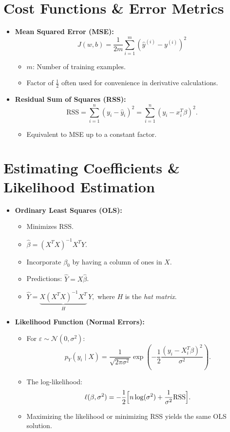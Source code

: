 \documentclass[10pt]{article}
\begin{document}
\section{Cost Functions \& Error Metrics}
\begin{itemize}
    \item \textbf{Mean Squared Error (MSE):}
    \[
    J(w,b)=\frac{1}{2m} \sum_{i=1}^{m}\left(\hat{y}^{(i)}-y^{(i)}\right)^{2}
    \]
    \begin{itemize}
        \item \(m\): Number of training examples.
        \item Factor of \(\tfrac{1}{2}\) often used for convenience in derivative calculations.
    \end{itemize}
    \item \textbf{Residual Sum of Squares (RSS):}
    \[
    \mathrm{RSS}=\sum_{i=1}^{n}\left(y_{i}-\hat{y}_{i}\right)^{2}=\sum_{i=1}^{n}\left(y_{i}-x_{i}^{T}\beta\right)^{2}.
    \]
    \begin{itemize}
        \item Equivalent to MSE up to a constant factor.
    \end{itemize}
\end{itemize}

\section{Estimating Coefficients \& Likelihood Estimation}
\begin{itemize}
    \item \textbf{Ordinary Least Squares (OLS):}
    \begin{itemize}
        \item Minimizes RSS.
        \item \(\displaystyle \hat{\beta}=(X^{T}X)^{-1}X^{T}Y\).
        \item Incorporate \(\beta_0\) by having a column of ones in \(X\).
        \item Predictions: \(\hat{Y} = X\hat{\beta}\).
        \item \(\displaystyle \hat{Y} = \underbrace{X(X^{T}X)^{-1}X^{T}}_{H}\,Y,\) where \(H\) is the \textit{hat matrix}.
    \end{itemize}
    \item \textbf{Likelihood Function (Normal Errors):}
    \begin{itemize}
        \item For \(\varepsilon \sim \mathcal{N}(0,\sigma^2)\):
        \[
        p_Y(y_i \mid X)= \frac{1}{\sqrt{2\pi\sigma^2}} \exp\left(-\frac{1}{2}\frac{(y_i - X_i^T\beta)^2}{\sigma^2}\right).
        \]
        \item The log-likelihood:
        \[
        \ell(\beta, \sigma^2) 
        = -\frac{1}{2}\Bigl[n\log(\sigma^2) + \frac{1}{\sigma^2}\mathrm{RSS}\Bigr].
        \]
        \item Maximizing the likelihood or minimizing RSS yields the same OLS solution.
    \end{itemize}
\end{itemize}
\end{document}
